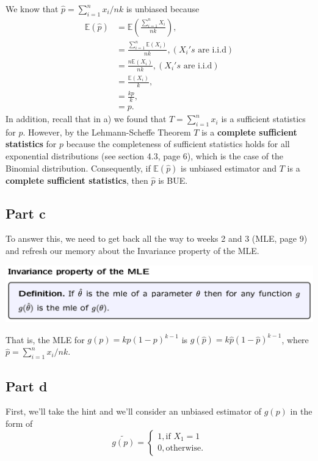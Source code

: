 \documentclass[12pt]{article}
\begin{document}
We know that $\hat{p} = \sum_{i=1}^{n}x_{i}/nk$ is unbiased because
\begin{align}
\mathbb{E}(\hat{p}) & = \mathbb{E}\left(\frac{\sum_{i=1}^{n}X_{i}}{nk}\right), \\
& = \frac{\sum_{i=1}^{n} \mathbb{E}(X_{i}) }{nk} , (X_{i}'s \mbox{ are i.i.d})\\
& = \frac{n \mathbb{E}(X_{i}) }{nk} , (X_{i}'s \mbox{ are i.i.d}) \\
& = \frac{\mathbb{E}(X_{i}) }{k} , \\
& = \frac{kp}{k}, \\
& = p.
\end{align}
In addition, recall that in a) we found that $T = \sum_{i=1}^{n}x_{i}$ is a sufficient statistics for $p$. However, by the Lehmann-Scheffe Theorem $T$ is a \textbf{complete sufficient statistics} for $p$ because the completeness of sufficient statistics holds for all exponential distributions (see section 4.3, page 6), which is the case of the Binomial distribution. Consequently, if $\mathbb{E}(\hat{p})$ is unbiased estimator and $T$ is a \textbf{complete sufficient statistics}, then $\hat{p}$ is BUE.

\subsection*{Part c}

To answer this, we need to get back all the way to weeks 2 and 3 (MLE, page 9) and refresh our memory about the Invariance property of the MLE.

\includegraphics[width=1\linewidth]{invariance.png}

That is, the MLE for $g(p) = kp(1-p)^{k-1}$ is $g(\hat{p}) = k\hat{p}(1-\hat{p})^{k-1}$, where $\hat{p} = \sum_{i=1}^{n}x_{i}/nk$.

\subsection*{Part d}

First, we'll take the hint and we'll consider an unbiased estimator of $g(p)$ in the form of
\begin{equation} \tilde{g(p)} = 
    \begin{cases}
      1, \mbox{if } X_{1} = 1 \\
      0, \mbox{otherwise}. 
    \end{cases}
\end{equation}
\end{document}
